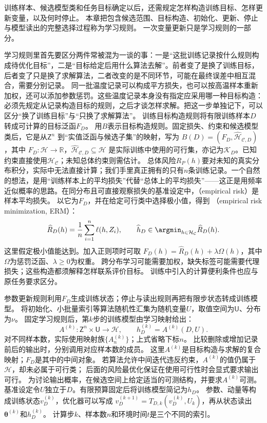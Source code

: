训练样本、候选模型类和任务目标确定以后，还需规定怎样构造训练目标、怎样更新变量，以及何时停止。
本章把包含候选范围、目标构造、初始化、更新、停止与模型读出的完整选择过程称为学习规则。
一次变量更新只是学习规则的一部分。

学习规则里首先要区分两件常被混为一谈的事：一是“这批训练记录按什么规则构成待优化目标”，二是“目标给定后用什么算法去解”。前者变了是换了训练目标，后者变了只是换了求解算法，二者改变的是不同环节，可能在最终误差中相互混合，需要分别记录。
同一批温度记录可以构成平方损失，也可以按高温样本重新加权，还可以添加参数惩罚。这些温度记录本身没有指定应采用哪一种目标构造：必须先规定从记录构造目标的规则，之后才谈怎样求解。把这一步单独记下，可以区分“换了训练目标”与“只换了求解算法”。
训练目标构造规则将有限训练样本$D$转成可计算的目标泛函$F_D$。
用$B$表示目标构造规则。固定损失、约束和候选模型类后，它是从$\mathsf Z^n$
到“实值泛函与候选子集”的映射，写为
$B(D)=(F_D,\widehat{\mathcal H}_{\mathcal C,D})$，其中
$F_D:\mathcal H\to\mathbb R$，$\widehat{\mathcal H}_{\mathcal C,D}\subseteq\mathcal H$
是实际训练中使用的可行集，亦记为$\mathcal K_D$。已知约束直接使用$\mathcal H_{\mathcal C}$；未知总体约束则需估计。
总体风险$R_P(h)$要对未知的真实分布积分，实际中无法直接计算；我们手里真正拥有的只有$n$条训练记录。一个自然的想法，是用“训练样本上的平均损失”代替“总体上的平均损失”——这正是用频率近似概率的思路。在同分布且可直接观察损失的基准设定中，（empirical risk）是样本平均损失。
以它为$F_D$，并在给定可行类中选择极小值，得到
（empirical risk minimization, ERM）：
\begin{equation}
  \widehat R_D(h)=\frac1n\sum_{i=1}^n\ell(h,Z_i),\qquad
  \widehat h_D\in\argmin_{h\in\mathcal H_{\mathcal C}}\widehat R_D(h).
  \label{eq:future-unified-empirical-problem}
\end{equation}
这里假定极小值能达到。加入正则项时可取
$F_D(h)=\widehat R_D(h)+\lambda\Omega(h)$，其中$\Omega$为惩罚泛函、$\lambda\geq0$为权重。
跨分布学习可能需要加权，缺失标签可能需要代理损失；这些构造都须解释怎样联系评价目标。
训练中引入的计算便利条件也应与原任务要求区分。

参数更新规则利用$F_D$生成训练状态；停止与读出规则再把有限步状态转成训练模型。
将初始化、小批量索引等算法随机性汇集为随机变量$U$，取值空间为$\mathsf U$、分布为$\nu$。
固定学习规则后，第$k$步的训练模型由学习映射给出：
\begin{equation}
  A^{(k)}:\mathsf Z^n\times\mathsf U\to\mathcal H,
  \qquad h_D^{(k)}=A^{(k)}(D,U).
  \label{eq:future-learning-algorithm-output}
\end{equation}
对不同样本数，实际使用映射族$\{A_n^{(k)}\}$；上式省略下标$n$。
比较删除或增加记录前后的输出时，分别调用对应样本数的成员。
这里$A^{(k)}$是目标构造与求解的复合映射；$F_D$是其中的中间对象。
若算法允许中间迭代违反约束，$A^{(k)}$的值仍属于$\mathcal H$，却未必属于可行类；
后面的风险最优化保证在使用可行性时会显式要求输出可行。
为讨论输出概率，在候选空间上给定适当的可测结构，并要求$A^{(k)}$可测。
基准设定令$U$独立于$D$。有限预算固定后将训练模型简记为$h_D$。
参数、动量等构成训练状态$v_D^{(k)}$，优化器可以写成
$v_D^{(k+1)}=T_{D,k}(v_D^{(k)},U_k)$，再从状态读出$\bm\theta^{(k)}$和$h_D^{(k)}$。
计算步$k$、样本数$n$和环境时间$t$是三个不同的索引。

